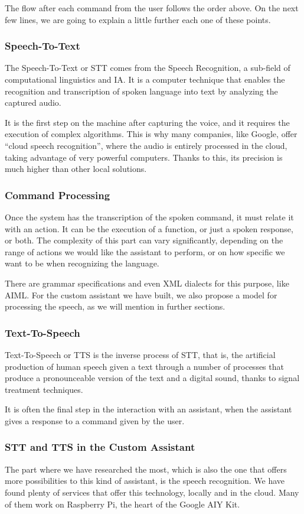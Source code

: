 The flow after each command from the user follows the order above. On the next few lines, we are going to explain a little further
each one of these points.

\subsubsection{Speech-To-Text}
The Speech-To-Text or STT comes from the Speech Recognition, a sub-field of computational linguistics and IA. It is a computer
technique that enables the recognition and transcription of spoken language into text by analyzing the captured audio.

It is the first step on the machine after capturing the voice, and it requires the execution of complex algorithms. This is why many
companies, like Google, offer “cloud speech recognition”, where the audio is entirely processed in the cloud, taking advantage of
very powerful computers. Thanks to this, its precision is much higher than other local solutions.

\subsubsection{Command Processing}
Once the system has the transcription of the spoken command, it must relate it with an action. It can be the execution of a function,
or just a spoken response, or both. The complexity of this part can vary significantly, depending on the range of actions we would
like the assistant to perform, or on how specific we want to be when recognizing the language.

There are grammar specifications and even XML dialects for this purpose, like AIML. For the custom assistant we have built, we also
propose a model for processing the speech, as we will mention in further sections.

\subsubsection{Text-To-Speech}
Text-To-Speech or TTS is the inverse process of STT, that is, the artificial production of human speech given a text through a
number of processes that produce a pronounceable version of the text and a digital sound, thanks to signal treatment techniques.

It is often the final step in the interaction with an assistant, when the assistant gives a response to a command given by the user.

\subsubsection{STT and TTS in the Custom Assistant}
The part where we have researched the most, which is also the one that offers more possibilities to this kind of assistant, is the
speech recognition. We have found plenty of services that offer this technology, locally and in the cloud. Many of them work on
Raspberry Pi, the heart of the Google AIY Kit.

